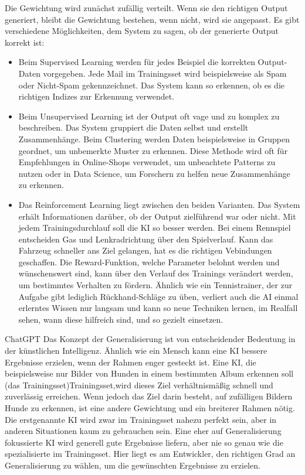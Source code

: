 Die Gewichtung wird zunächst zufällig verteilt. Wenn sie den richtigen Output generiert, bleibt die Gewichtung bestehen, wenn nicht, wird sie angepasst. Es gibt verschiedene Möglichkeiten, dem System zu sagen, ob der generierte Output korrekt ist:\cite{dongare2012introduction}

\begin{itemize}
    \item Beim Supervised Learning werden für jedes Beispiel die korrekten Output-Daten vorgegeben. Jede Mail im Trainingsset wird beispielsweise als Spam oder Nicht-Spam gekennzeichnet. Das System kann so erkennen, ob es die richtigen Indizes zur Erkennung verwendet.
    \item Beim Unsupervised Learning ist der Output oft vage und zu komplex zu beschreiben. Das System gruppiert die Daten selbst und erstellt Zusammenhänge. Beim Clustering werden Daten beispielsweise in Gruppen geordnet, um unbemerkte Muster zu erkennen.\cite{altexsoft2021unsupervised} Diese Methode wird oft für Empfehlungen in Online-Shops verwendet, um unbeachtete Patterns zu nutzen oder in Data Science, um Forschern zu helfen neue Zusammenhänge zu erkennen.
    \item Das Reinforcement Learning liegt zwischen den beiden Varianten. Das System erhält Informationen darüber, ob der Output zielführend war oder nicht. \cite{synopsys2024reinforcement} Mit jedem Trainingsdurchlauf soll die KI so besser werden. Bei einem Rennspiel entscheiden Gas und Lenkradrichtung über den Spielverlauf. Kann das Fahrzeug schneller ans Ziel gelangen, hat es die richtigen Vebindungen geschaffen. Die Reward-Funktion, welche Parameter belohnt werden und wünschenswert sind, kann über den Verlauf des Trainings verändert werden, um bestimmtes Verhalten zu fördern. Ähnlich wie ein Tennistrainer, der zur Aufgabe gibt lediglich Rückhand-Schläge zu üben, verliert auch die AI einmal erlerntes Wissen nur langsam und kann so neue Techniken lernen, im Realfall sehen, wann diese hilfreich sind, und so gezielt einsetzen.
\end{itemize}


ChatGPT
Das Konzept der Generalisierung ist von entscheidender Bedeutung in der künstlichen Intelligenz. Ähnlich wie ein Mensch kann eine KI bessere Ergebnisse erzielen, wenn der Rahmen enger gesteckt ist. Eine KI, die beispielsweise nur Bilder von Hunden in einem bestimmten Album erkennen soll (das Trainingsset)\gls{Trainingsset},wird dieses Ziel verhältnismäßig schnell und zuverlässig erreichen. Wenn jedoch das Ziel darin besteht, auf zufälligen Bildern Hunde zu erkennen, ist eine andere Gewichtung und ein breiterer Rahmen nötig. Die erstgenannte KI wird zwar im Trainingsset nahezu perfekt sein, aber in anderen Situationen kaum zu gebrauchen sein. Eine eher auf Generalisierung fokussierte KI wird generell gute Ergebnisse liefern, aber nie so genau wie die spezialisierte im Trainingsset. Hier liegt es am Entwickler, den richtigen Grad an Generalisierung zu wählen, um die gewünschten Ergebnisse zu erzielen.\cite{lark2023generalization}

